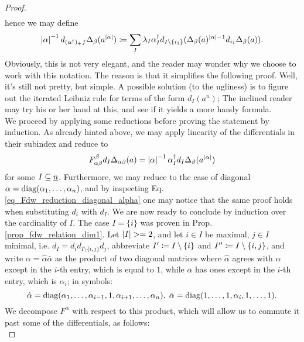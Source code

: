 \begin{cor}
\begin{proof}
\begin{gather*}
  \end{gather*}
  hence we may define
  \begin{equation*}
    \abs{\alpha}^{-1} d_{(\alpha^\dagger)_+ f} \Delta_{\beta}(a^{\abs{\alpha}}) \defas %
    \sum_I \lambda_I \alpha^\dagger_I d_{I \setminus \{i_1\}}
      (\Delta_{\beta}(a)^{\abs{\alpha}-1} d_{i_1} \Delta_{\beta}(a)).
  \end{equation*}
  Obviously, this is not very elegant, and the reader may wonder why we choose to work with this notation. The reason is that it simplifies the following proof. Well, it's still not pretty, but simple. A possible solution (to the ugliness) is to figure out the iterated Leibniz rule for terms of the form $d_I (a^n)$; The inclined reader may try his or her hand at this, and see if it yields a more handy formula. \\
  We proceed by applying some reductions before proving the statement by induction. As already hinted above, we may apply linearity of the differentials in their subindex and reduce to
  \begin{equation*}
    F_{\alpha\beta}^\beta d_I \Delta_{\alpha\beta} (a) =%
    \abs{\alpha}^{-1}\alpha^\dagger_I d_I \Delta_{\beta}(a^{\abs{\alpha}})%
  \end{equation*}
  for some $I \subseteq \underline{n}$. Furthermore, we may reduce to the case of diagonal $\alpha = \mathrm{diag}(\alpha_1, \ldots, \alpha_n)$, and by inspecting Eq. \ref{eq_Fdw_reduction_diagonal_alpha} one may notice that the same proof holds when substituting $d_i$ with $d_I$. We are now ready to conclude by induction over the cardinality of $I$. The case $I = \{i\}$ was proven in Prop. \ref{prop_fdw_relation_dim1}. Let $\left\vert I\right\vert >= 2$, and let $i \in I$ be maximal, $j\in I$ minimal, i.e. $d_I = d_i d_{I \setminus \{i,j\}} d_j$, abbreviate $I^\prime \coloneqq I \setminus \{i\}$ and $I^{\prime\prime} \coloneqq I \setminus \{i,j\}$, and write $\alpha = \hat \alpha \bar \alpha$ as the product of two diagonal matrices where $\hat \alpha$ agrees with $\alpha$ except in the $i$-th entry, which is equal to $1$, while $\bar \alpha$ has ones except in the $i$-th entry, which is $\alpha_i$; in symbols:
  \begin{equation*}
    \hat \alpha = \diag(\alpha_1, \ldots, \alpha_{i-1}, 1, \alpha_{i+1}, \ldots, \alpha_n),\;%
      \bar \alpha = \diag(1,\ldots,1,\alpha_i,1,\ldots,1).
  \end{equation*}
  We decompose $F^\alpha$ with respect to this product, which will allow us to commute it past some of the differentials, as follows:\\

\end{proof}
\end{cor}
